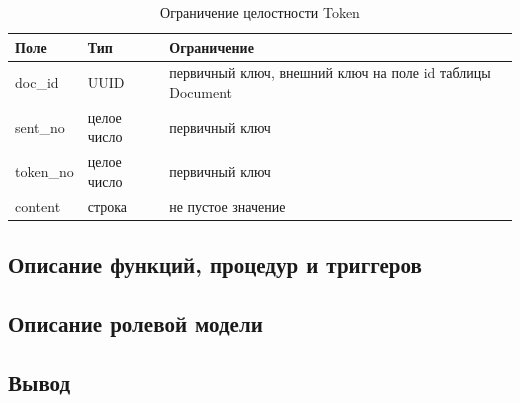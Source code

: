 \begin{table}[H]
\centering
\caption{Ограничение целостности Token}
\begin{tabular}{|m{3cm}|m{3cm}|m{6cm}|}
\hline
\textbf{Поле} & \textbf{Тип} & \textbf{Ограничение} \\ \hline
doc\_id & UUID & первичный ключ, внешний ключ на поле id таблицы Document \\ \hline
sent\_no & целое число & первичный ключ \\ \hline
token\_no & целое число & первичный ключ \\ \hline
content & строка & не пустое значение \\ \hline
\end{tabular}
\end{table}

\subsection{Описание функций, процедур и триггеров}

\subsection{Описание ролевой модели}

\subsection{Вывод}
